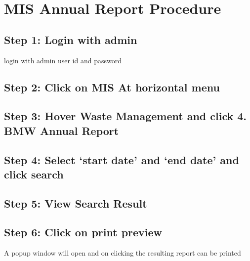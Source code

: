 \documentclass[letterpaper,10pt,english]{sphinxmanual}
\begin{document}
\chapter{MIS Annual Report Procedure}
\label{\detokenize{MIS Annual Report Procedure:mis-annual-report-procedure}}\label{\detokenize{MIS Annual Report Procedure::doc}}

\section{Step 1: Login with admin}
\label{\detokenize{MIS Annual Report Procedure:step-1-login-with-admin}}
login with admin user id and password

\noindent{}


\section{Step 2: Click on MIS At horizontal menu}
\label{\detokenize{MIS Annual Report Procedure:step-2-click-on-mis-at-horizontal-menu}}
\noindent{}


\section{Step 3: Hover Waste Management and click 4. BMW Annual Report}
\label{\detokenize{MIS Annual Report Procedure:step-3-hover-waste-management-and-click-4-bmw-annual-report}}
\noindent{}


\section{Step 4: Select `start date' and `end date' and click search}
\label{\detokenize{MIS Annual Report Procedure:step-4-select-start-date-and-end-date-and-click-search}}
\noindent{}


\section{Step 5: View Search Result}
\label{\detokenize{MIS Annual Report Procedure:step-5-view-search-result}}
\noindent{}


\section{Step 6: Click on print preview}
\label{\detokenize{MIS Annual Report Procedure:step-6-click-on-print-preview}}
A popup window will open and on clicking the resulting report can be printed
\end{document}
